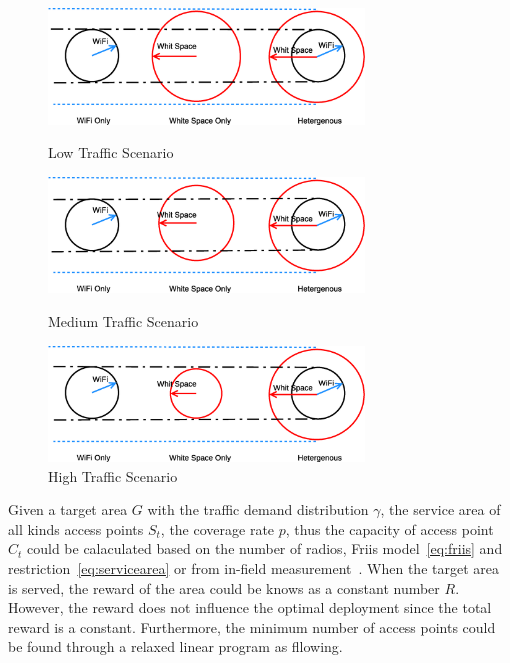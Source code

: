 \begin{figure}
\centering
\includegraphics[width=84mm]{figures/lowtraffic}
\vspace{-0.1in}
\caption{Low Traffic Scenario}                                                                 
\label{fig:lowtraffic}

\includegraphics[width=84mm]{figures/mediumtraffic}
\vspace{-0.1in}
\caption{Medium Traffic Scenario}                                                                 
\label{fig:mediumtraffic}


\includegraphics[width=84mm]{figures/hightraffic}
\vspace{-0.1in}
\caption{High Traffic Scenario}                                                                 
\label{fig:hightraffic}
\vspace{-0.1in}
\end{figure}

Given a target area $G$ with the traffic demand distribution $\gamma$, the service area 
of all kinds access points $S_t$, the coverage rate $p$, thus the capacity of access point $C_t$ could 
be calaculated based on the number of radios, Friis model~\ref{eq:friis} and restriction~\ref{eq:servicearea}
or from in-field measurement~\cite{cuileveraging}. When the target area is served, the reward of the area 
could be knows as a constant number $R$. However, the reward does not influence the optimal deployment since 
the total reward is a constant. Furthermore, the minimum number of access points could be found through 
a relaxed linear program as fllowing. 

